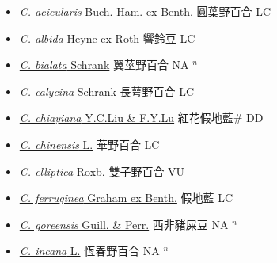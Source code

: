 \begin{itemize}
  \begin{itemize}
        \item[] \href{http://www.theplantlist.org/tpl1.1/search?q=Crotalaria+acicularis}{\textit{C. acicularis} Buch.-Ham. ex Benth.}   圓葉野百合 LC
        \item[] \href{http://www.theplantlist.org/tpl1.1/search?q=Crotalaria+albida}{\textit{C. albida} Heyne ex Roth}   響鈴豆 LC
        \item[] \href{http://www.theplantlist.org/tpl1.1/search?q=Crotalaria+bialata}{\textit{C. bialata} Schrank}   翼莖野百合 NA $^n$
        \item[] \href{http://www.theplantlist.org/tpl1.1/search?q=Crotalaria+calycina}{\textit{C. calycina} Schrank}   長萼野百合 LC
        \item[] \href{http://www.theplantlist.org/tpl1.1/search?q=Crotalaria+chiayiana}{\textit{C. chiayiana} Y.C.Liu \& F.Y.Lu}   紅花假地藍\# DD
        \item[] \href{http://www.theplantlist.org/tpl1.1/search?q=Crotalaria+chinensis}{\textit{C. chinensis} L.}   華野百合 LC
        \item[] \href{http://www.theplantlist.org/tpl1.1/search?q=Crotalaria+elliptica}{\textit{C. elliptica} Roxb.}   雙子野百合 VU
        \item[] \href{http://www.theplantlist.org/tpl1.1/search?q=Crotalaria+ferruginea}{\textit{C. ferruginea} Graham ex Benth.}   假地藍 LC
        \item[] \href{http://www.theplantlist.org/tpl1.1/search?q=Crotalaria+goreensis}{\textit{C. goreensis} Guill. \& Perr.}   西非豬屎豆 NA $^n$
        \item[] \href{http://www.theplantlist.org/tpl1.1/search?q=Crotalaria+incana}{\textit{C. incana} L.}   恆春野百合 NA $^n$

\end{itemize}
\end{itemize}

